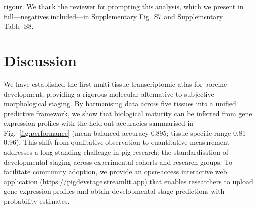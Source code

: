 \documentclass[10pt,a4paper]{article}
\begin{document}
rigour. We thank the reviewer for prompting this analysis, which we present in full---negatives included---in Supplementary Fig.~S7 and Supplementary Table~S8.

\section{Discussion}

We have established the first multi-tissue transcriptomic atlas for porcine development, providing a rigorous molecular alternative to subjective morphological staging\cite{swindle_swine_2012}. By harmonising data across five tissues into a unified predictive framework, we show that biological maturity can be inferred from gene expression profiles with the held-out accuracies summarised in Fig.~\ref{fig:performance} (mean balanced accuracy 0.895; tissue-specific range 0.81--0.96). This shift from qualitative observation to quantitative measurement addresses a long-standing challenge in pig research: the standardisation of developmental staging across experimental cohorts and research groups. To facilitate community adoption, we provide an open-access interactive web application (\url{https://pigdevstage.streamlit.app}) that enables researchers to upload gene expression profiles and obtain developmental stage predictions with probability estimates.
\end{document}
